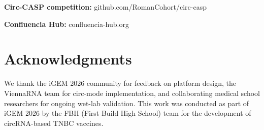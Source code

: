 \documentclass[12pt]{article}
\begin{document}
\textbf{Circ-CASP competition:} github.com/RomanCohort/circ-casp

\textbf{Confluencia Hub:} confluencia-hub.org

\section{Acknowledgments}

We thank the iGEM 2026 community for feedback on platform design, the ViennaRNA team for circ-mode implementation, and collaborating medical school researchers for ongoing wet-lab validation. This work was conducted as part of iGEM 2026 by the FBH (First Build High School) team for the development of circRNA-based TNBC vaccines.



\end{document}
